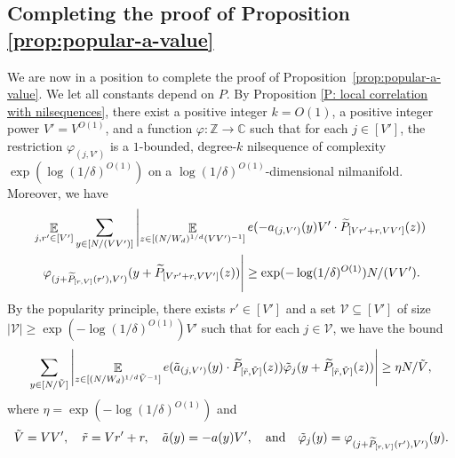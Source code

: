 \documentclass[11pt]{amsart}
\theoremstyle{definition}
\DeclareMathOperator*{\E}{\mathbb{E}}
\newcommand{\C}{{\mathbb C}}
\newcommand{\Z}{{\mathbb Z}}
\begin{document}
\subsection{Completing the proof of Proposition \ref{prop:popular-a-value}}
We are now in a position to complete the proof of Proposition~\ref{prop:popular-a-value}. We let all constants depend on $P$.
By Proposition \ref{P: local correlation with nilsequences}, there exist a positive integer $k=O(1)$, 
    a positive integer power $V' = V^{O(1)}$, and a function $\varphi:\Z\to\C$ such that for each $j\in[V']$, the restriction $\varphi_{(j,V')}$ is a $1$-bounded, degree-$k$ nilsequence of complexity $\exp(\log(1/\delta)^{O(1)})$ on a $\log(1/\delta)^{O(1)}$-dimensional nilmanifold. Moreover, we have 
\begin{multline*}
    \E_{j, r'\in[V']}\sum_{y\in[N/(VV')]}\left|\E_{z \in [(N/W_d)^{1/d}(VV')^{-1}]} e(-a_{(j, V')}(y)V'\cdot\widetilde{P}_{[Vr'+r,VV']}(z))\right.\\
    \left.\varphi_{({j} + \widetilde{P}_{[r,V]}(r'), V')}(y + \widetilde{P}_{[Vr'+r,VV']}(z)) \vphantom{\E_{z \in [(N/W_d)^{1/d}(VV')^{-1}]}} \right| \geq \exp(-\log(1/\delta)^{O(1)}) N/(VV').
\end{multline*}
By the popularity principle, there exists $r'\in[V']$ and a set $\mathcal{V}\subseteq [V']$ of size $|\mathcal{V}|\geq \exp(-\log(1/\delta)^{O(1)})V'$ such that for each $j\in\mathcal{V}$, we have the bound
\begin{align}\label{E: lower bound for j in V}
    \sum_{y\in [N/\tilde{V}]}\left|\E_{z \in [(N/W_d)^{1/d}\tilde{V}^{-1}]} e(\tilde{a}_{(j,V')}(y)\cdot\widetilde{P}_{[\tilde{r},\tilde{V}]}(z))\tilde{\varphi}_{j}(y + \widetilde{P}_{[\tilde{r},\tilde{V}]}(z)) \vphantom{\E_{z \in [(N/W_d)^{1/d}\tilde{V}^{-1}]}} \right| \geq \eta N/\tilde{V},
\end{align}
 where $\eta=\exp(-\log(1/\delta)^{O(1)})$ and
\begin{align*}
    \tilde{V}=VV',\quad \tilde{r} = Vr'+r,\quad \tilde{a}(y) = -a(y)V',\quad\textrm{and}\quad   \Tilde{\varphi}_j(y)= \varphi_{({j} + \widetilde{P}_{[r,V]}(r'), V')}(y).
\end{align*}
\end{document}
